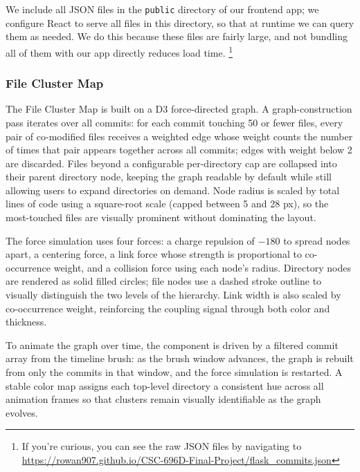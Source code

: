 \documentclass[12 pt]{article}
\begin{document}
We include all JSON files in the \texttt{public} directory of our frontend
app; we configure React to serve all files in this directory, so that at runtime
we can query them as needed. We do this because these files are fairly large, and not
bundling all of them with our app directly reduces load time. \footnote{If you're
curious, you can see the raw JSON files by navigating to
\url{https://rowan907.github.io/CSC-696D-Final-Project/flask_commits.json}} \par


\subsubsection*{File Cluster Map}
The File Cluster Map is built on a D3 force-directed graph.
A graph-construction pass iterates over all commits: for each commit touching
50 or fewer files, every pair of co-modified files receives a weighted edge
whose weight counts the number of times that pair appears together across all
commits; edges with weight below 2 are discarded.
Files beyond a configurable per-directory cap are collapsed into their parent
directory node, keeping the graph readable by default while still allowing
users to expand directories on demand.
Node radius is scaled by total lines of code using a square-root scale
(capped between 5 and 28 px), so the most-touched files are visually
prominent without dominating the layout.

The force simulation uses four forces: a charge repulsion of $-180$ to spread
nodes apart, a centering force, a link force whose strength is proportional
to co-occurrence weight, and a collision force using each node's radius.
Directory nodes are rendered as solid filled circles; file nodes use a dashed
stroke outline to visually distinguish the two levels of the hierarchy.
Link width is also scaled by co-occurrence weight, reinforcing the coupling
signal through both color and thickness.

To animate the graph over time, the component is driven by a filtered commit
array from the timeline brush: as the brush window advances, the graph is
rebuilt from only the commits in that window, and the force simulation is
restarted.
A stable color map assigns each top-level directory a consistent hue across
all animation frames so that clusters remain visually identifiable as the
graph evolves.
\end{document}
